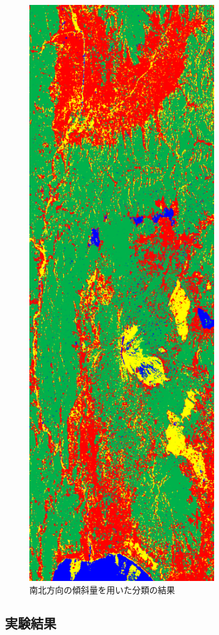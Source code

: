 \documentclass[a4j, twocolumn]{jsarticle}
\begin{document}
 \begin{figure}[!t]
 \centering
 \includegraphics[width=8cm]{rgb_south_20.png}
 \caption{南北方向の傾斜量を用いた分類の結果}
 \label{pqnn_south}
\end{figure}
\clearpage
\subsection{実験結果}
\end{document}
